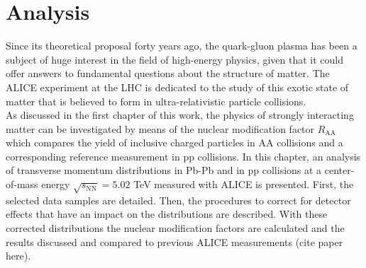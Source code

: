 \documentclass[12pt,a4paper]{report}
\begin{document}
\chapter{Analysis}
Since its theoretical proposal forty years ago, the quark-gluon plasma has been a subject of huge interest in the field of high-energy physics, given that it could offer answers to fundamental questions about the structure of matter. The ALICE experiment at the LHC is dedicated to the study of this exotic state of matter that is believed to form in ultra-relativistic particle collisions. \\
As discussed in the first chapter of this work, the physics of strongly interacting matter can be investigated by means of the nuclear modification factor $R_\text{AA}$ which compares the yield of inclusive charged particles in AA collisions and a corresponding reference measurement in pp collisions. In this chapter, an analysis of transverse momentum distributions in Pb-Pb and in pp collisions at a center-of-mass energy $\sqrt{s_\text{NN}}= 5.02$ TeV measured with ALICE is presented. First, the selected data samples are detailed. Then, the procedures to correct for detector effects that have an impact on the \pt distributions are described. With these corrected \pt distributions the nuclear modification factors are calculated and the results discussed and compared to previous ALICE measurements (cite paper here).
\end{document}
